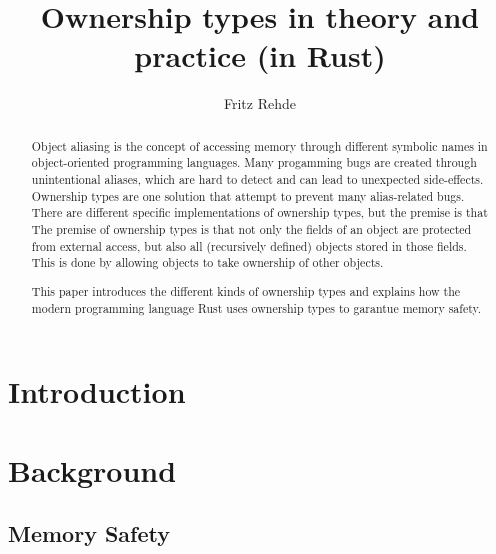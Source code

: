 \documentclass[sigplan,11pt,nonacm]{acmart}
\begin{document}
\title{Ownership types in theory and practice (in Rust)}
\author{Fritz Rehde}

\begin{abstract}


Object aliasing is the concept of accessing memory through different symbolic names in object-oriented programming languages.
Many progamming bugs are created through unintentional aliases, which are hard to detect and can lead to unexpected side-effects.
Ownership types are one solution that attempt to prevent many alias-related bugs.
There are different specific implementations of ownership types, but the premise is that 
The premise of ownership types is that not only the fields of an object are protected from external access, but also all (recursively defined) objects stored in those fields.
This is done by allowing objects to take ownership of other objects.

This paper introduces the different kinds of ownership types and explains how the modern programming language Rust uses ownership types to garantue memory safety.

\end{abstract}


\maketitle

\section{Introduction}
\label{sec:introduction}


\section{Background}
\label{sec:background}

\subsection{Memory Safety}
\end{document}
